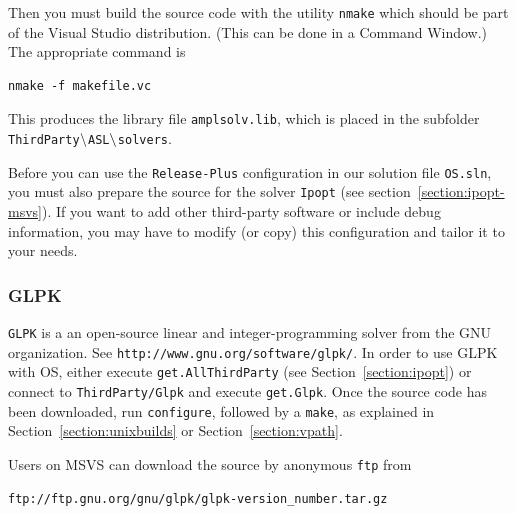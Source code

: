 \documentclass[11pt]{article}
\renewcommand{\_}{{\char"5F}}
\renewcommand{\{}{{\char"7B}}
\renewcommand{\}}{{\char"7D}}
\renewcommand{\^}{{\char"0D}}
\renewcommand{\'}{{\char"0D}}
\newif\ifipopt  \ipopttrue      %
\newcommand{\UrlGlpk}{http://www.gnu.org/software/glpk/}
\begin{document}
Then you must build the source code with the utility {\tt nmake}
which should be part of the Visual Studio distribution. (This can be done in a Command Window.)
The appropriate command is
\begin{verbatim}
nmake -f makefile.vc
\end{verbatim}
This produces the library file {\tt amplsolv.lib}, which is placed in the subfolder
{\tt ThirdParty$\tt\backslash$ASL$\tt\backslash$solvers}.

        
\ifipopt
Before you can use the {\tt Release-Plus} 
configuration in our solution file {\tt OS.sln},
you must also prepare the source for the solver {\tt Ipopt}
(see section~\ref{section:ipopt-msvs}). If you want to add other third-party software or include debug information,
you may have to modify (or copy) this configuration and tailor it to your needs.
\else
Now you are ready to use MSVS. Both the {\tt Debug}\index{Microsoft Visual Studio!{\tt Debug} configuration} and 
{\tt Release}\index{Microsoft Visual Studio!{\tt Release} configuration} configurations contain two projects, 
{\tt libOSnl2OSiL} and {\tt OSAmplClient}, which use the ASL library and are normally deactivated. 
Activate these projects in the Configuration Manager\index{Microsoft Visual Studio!Configuration Manager} 
(available from the Build menu), then select Build.
\fi
{}

\subsubsection{GLPK}

%
{\tt GLPK} is a an open-source linear and integer-programming solver from the GNU organization.
See {\tt\UrlGlpk}.  In order to use GLPK with OS, either execute {\tt get.AllThirdParty}
(see Section~\ref{section:ipopt})
or connect to {\tt ThirdParty/Glpk} and execute {\tt get.Glpk}. Once the source code has been downloaded,
run {\tt configure}, followed by a {\tt make}, as explained in Section~\ref{section:unixbuilds} or Section~\ref{section:vpath}.

Users on MSVS can download the source by anonymous {\tt ftp} from
\begin{verbatim}
ftp://ftp.gnu.org/gnu/glpk/glpk-version_number.tar.gz
\end{verbatim}
\end{document}
